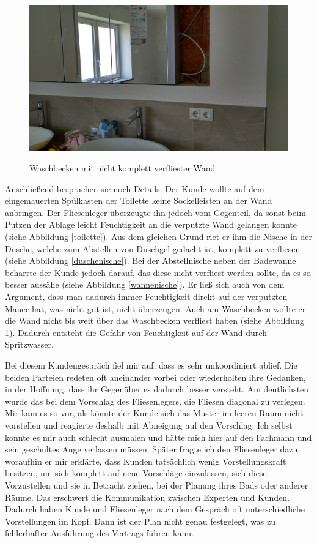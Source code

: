 \begin{figure}[h]
	\begin{center}
		\noindent\includegraphics[scale=0.1]{Resources/Praktikum/IMG_20180801_131936_HDR.jpg}
		\label{waschbecken}
		\caption{Waschbecken mit nicht komplett verfliester Wand}	
	\end{center}
\end{figure}

Anschließend besprachen sie noch Details. Der Kunde wollte auf dem eingemauerten Spülkasten der Toilette keine Sockelleisten an der Wand anbringen. Der Fliesenleger überzeugte ihn jedoch vom Gegenteil, da sonst beim Putzen der Ablage leicht Feuchtigkeit an die verputzte Wand gelangen konnte (siehe Abbildung \ref{toilette}). Aus dem gleichen Grund riet er ihm die Nische in der Dusche, welche zum Abstellen von Duschgel gedacht ist, komplett zu verfliesen (siehe Abbildung \ref{duschenische}). Bei der Abstellnische neben der Badewanne beharrte der Kunde jedoch darauf, das diese nicht verfliest werden sollte, da es so besser aussähe (siehe Abbildung \ref{wannenische}). Er ließ sich auch von dem Argument, dass man dadurch immer Feuchtigkeit direkt auf der verputzten Mauer hat, was nicht gut ist, nicht überzeugen. Auch am Waschbecken wollte er die Wand nicht bis weit über das Waschbecken verfliest haben (siehe Abbildung \ref{waschbecken}). Dadurch entsteht die Gefahr von Feuchtigkeit auf der Wand durch Spritzwasser.

Bei diesem Kundengespräch fiel mir auf, dass es sehr unkoordiniert ablief. Die beiden Parteien redeten oft aneinander vorbei oder wiederholten ihre Gedanken, in der Hoffnung, dass ihr Gegenüber es dadurch besser versteht. Am deutlichsten wurde das bei dem Vorschlag des Fliesenlegers, die Fliesen diagonal zu verlegen. Mir kam es so vor, als könnte der Kunde sich das Muster im leeren Raum nicht vorstellen und reagierte deshalb mit Abneigung auf den Vorschlag. Ich selbst konnte es mir auch schlecht ausmalen und hätte mich hier auf den Fachmann und sein geschultes Auge verlassen müssen. Später fragte ich den Fliesenleger dazu, woraufhin er mir erklärte, dass Kunden tatsächlich wenig Vorstellungskraft besitzen, um sich komplett auf neue Vorschläge einzulassen, sich diese Vorzustellen und sie in Betracht ziehen, bei der Planung ihres Bads oder anderer Räume. Das erschwert die Kommunikation zwischen Experten und Kunden. Dadurch haben Kunde und Fliesenleger nach dem Gespräch oft unterschiedliche Vorstellungen im Kopf. Dann ist der Plan nicht genau festgelegt, was zu fehlerhafter Ausführung des Vertrags führen kann.


